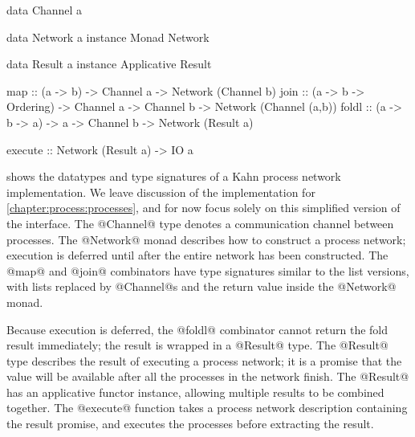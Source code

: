 \begin{haskell}[float,caption=Types and combinators for Kahn process networks,label=figs/kpn/combinators]
data Channel a

data Network a
instance Monad Network

data Result  a
instance Applicative Result

map     :: (a -> b) -> Channel a
        -> Network (Channel b)
join    :: (a -> b -> Ordering) -> Channel a -> Channel b
        -> Network (Channel (a,b))
foldl   :: (a -> b -> a) -> a -> Channel b
        -> Network (Result a)

execute :: Network (Result a) -> IO a
\end{haskell}

 shows the datatypes and type signatures of a Kahn process network implementation.
We leave discussion of the implementation for \cref{chapter:process:processes}, and for now focus solely on this simplified version of the interface.
The @Channel@ type denotes a communication channel between processes.
The @Network@ monad describes how to construct a process network; execution is deferred until after the entire network has been constructed.
The @map@ and @join@ combinators have type signatures similar to the list versions, with lists replaced by @Channel@s and the return value inside the @Network@ monad.

Because execution is deferred, the @foldl@ combinator cannot return the fold result immediately; the result is wrapped in a @Result@ type.
The @Result@ type describes the result of executing a process network; it is a promise that the value will be available after all the processes in the network finish.
The @Result@ has an applicative functor instance, allowing multiple results to be combined together.
The @execute@ function takes a process network description containing the result promise, and executes the processes before extracting the result.




